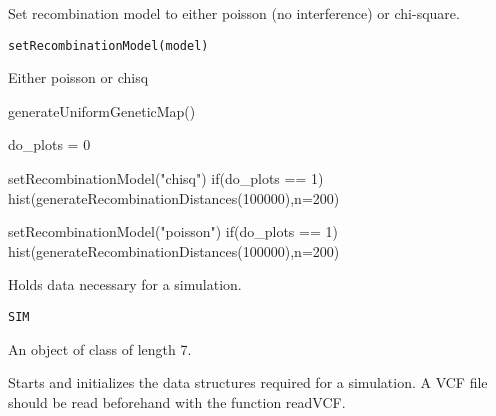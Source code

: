 \documentclass[letterpaper]{book}
\begin{document}
%
\begin{Description}\relax
Set recombination model to either poisson (no interference) or chi-square.
\end{Description}
%
\begin{Usage}
\begin{verbatim}
setRecombinationModel(model)
\end{verbatim}
\end{Usage}
%
\begin{Arguments}
\begin{ldescription}
\item[\code{model}] Either poisson or chisq
\end{ldescription}
\end{Arguments}
%
\begin{Examples}
\begin{ExampleCode}


generateUniformGeneticMap()

do_plots = 0

setRecombinationModel("chisq")
if(do_plots == 1)
 hist(generateRecombinationDistances(100000),n=200)

setRecombinationModel("poisson")
if(do_plots == 1)
 hist(generateRecombinationDistances(100000),n=200)

\end{ExampleCode}
\end{Examples}
%
\begin{Description}\relax
Holds data necessary for a simulation.
\end{Description}
%
\begin{Usage}
\begin{verbatim}
SIM
\end{verbatim}
\end{Usage}
%
\begin{Format}
An object of class  of length 7.
\end{Format}
%
\begin{Description}\relax
Starts and initializes the data structures required for a simulation. A VCF file
should be read beforehand with the function readVCF.
\end{Description}
\end{document}
